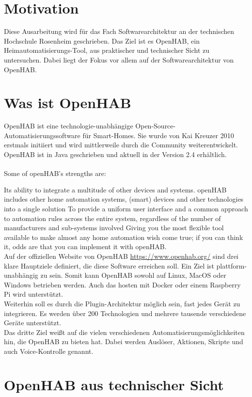 \section{Motivation}
Diese Ausarbeitung wird für das Fach Softwarearchitektur an der technischen Hochschule Rosenheim geschrieben.
Das Ziel ist es OpenHAB, ein Heimautomatisierungs-Tool, aus praktischer und technischer Sicht zu untersuchen. Dabei liegt der Fokus vor allem auf der Softwarearchitektur von OpenHAB. 

\section{Was ist OpenHAB}
OpenHAB ist eine technologie-unabhängige Open-Source-Automatisierungssoftware für Smart-Homes.
Sie wurde von Kai Kreuzer 2010 erstmals initiiert und wird mittlerweile durch die Community weiterentwickelt. OpenHAB ist in Java geschrieben und aktuell in der Version 2.4 erhältlich.\\
\\
Some of openHAB's strengths are:

Its ability to integrate a multitude of other devices and systems. openHAB includes other home automation systems, (smart) devices and other technologies into a single solution
To provide a uniform user interface and a common approach to automation rules across the entire system, regardless of the number of manufacturers and sub-systems involved
Giving you the most flexible tool available to make almost any home automation wish come true; if you can think it, odds are that you can implement it with openHAB.
\\
Auf der offiziellen Website von OpenHAB \url{https://www.openhab.org/} sind drei klare Hauptziele definiert, die diese Software erreichen soll. Ein Ziel ist plattform-unabhängig zu sein. Somit kann OpenHAB sowohl auf Linux, MacOS oder Windows betrieben werden. Auch das hosten mit Docker oder einem Raspberry Pi wird unterstützt.\\
Weiterhin soll es durch die Plugin-Architektur  möglich sein, fast jedes Gerät zu integrieren.
Es werden über 200 Technologien und mehrere tausende verschiedene Geräte unterstützt.\\
Das dritte Ziel weißt auf die vielen verschiedenen Automatisierungsmöglichkeiten hin, die OpenHAB zu bieten hat. Dabei werden Auslöser, Aktionen, Skripte und auch Voice-Kontrolle genannt.

\section{OpenHAB aus technischer Sicht}


